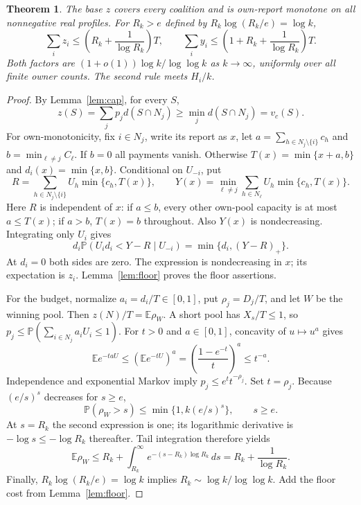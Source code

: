 \documentclass[11pt]{article}
\newtheorem{theorem}{Theorem}[section]
\theoremstyle{definition}\newtheorem{definition}[theorem]{Definition}
\theoremstyle{remark}\newtheorem{remark}[theorem]{Remark}
\newcommand{\E}{\mathbb E}
\newcommand{\Prob}{\mathbb P}
\begin{document}
\begin{theorem}\label{thm:upper}
The base $z$ covers every coalition and is own-report monotone on all
nonnegative real profiles. For $R_k>e$ defined by
$R_k\log(R_k/e)=\log k$,
\[
 \sum_i z_i\le\left(R_k+\frac1{\log R_k}\right)T,
 \qquad
 \sum_i y_i\le\left(1+R_k+\frac1{\log R_k}\right)T.
\]
Both factors are $(1+o(1))\log k/\log\log k$ as $k\to\infty$,
uniformly over all finite owner counts. The second rule meets $H_i/k$.
\end{theorem}
\begin{proof}
By Lemma~\ref{lem:cap}, for every $S$,
\[
 z(S)=\sum_jp_jd(S\cap N_j)\ge\min_jd(S\cap N_j)=v_c(S).
\]
For own-monotonicity, fix $i\in N_j$, write its report as $x$, let
$a=\sum_{h\in N_j\setminus\{i\}}c_h$ and
$b=\min_{\ell\ne j}C_\ell$. If $b=0$ all payments vanish. Otherwise
$T(x)=\min\{x+a,b\}$ and $d_i(x)=\min\{x,b\}$. Conditional on $U_{-i}$,
put
\[
 R=\sum_{h\in N_j\setminus\{i\}}U_h\min\{c_h,T(x)\},\qquad
 Y(x)=\min_{\ell\ne j}\sum_{h\in N_\ell}U_h\min\{c_h,T(x)\}.
\]
Here $R$ is independent of $x$: if $a\le b$, every other own-pool capacity
is at most $a\le T(x)$; if $a>b$, $T(x)=b$ throughout. Also $Y(x)$ is
nondecreasing. Integrating only $U_i$ gives
\[
 d_i\Prob(U_id_i<Y-R\mid U_{-i})=\min\{d_i,(Y-R)_+\}.
\]
At $d_i=0$ both sides are zero. The expression is nondecreasing in $x$;
its expectation is $z_i$. Lemma~\ref{lem:floor} proves the floor assertions.

For the budget, normalize $a_i=d_i/T\in[0,1]$, put $\rho_j=D_j/T$, and
let $W$ be the winning pool. Then $z(N)/T=\E\rho_W$. A short pool has
$X_s/T\le1$, so
$p_j\le\Prob(\sum_{i\in N_j}a_iU_i\le1)$.
For $t>0$ and $a\in[0,1]$, concavity of $u\mapsto u^a$ gives
\[
 \E e^{-taU}\le(\E e^{-tU})^a
 =\left(\frac{1-e^{-t}}t\right)^a\le t^{-a}.
\]
Independence and exponential Markov imply
$p_j\le e^t t^{-\rho_j}$. Set $t=\rho_j$. Because $(e/s)^s$ decreases
for $s\ge e$,
\[
 \Prob(\rho_W>s)\le\min\{1,k(e/s)^s\},\qquad s\ge e.
\]
At $s=R_k$ the second expression is one; its logarithmic derivative is
$-\log s\le-\log R_k$ thereafter. Tail integration therefore yields
\[
 \E\rho_W\le R_k+\int_{R_k}^{\infty}
 e^{-(s-R_k)\log R_k}\,ds=R_k+\frac1{\log R_k}.
\]
Finally, $R_k\log(R_k/e)=\log k$ implies
$R_k\sim\log k/\log\log k$. Add the floor cost from
Lemma~\ref{lem:floor}.
\end{proof}
\end{document}
